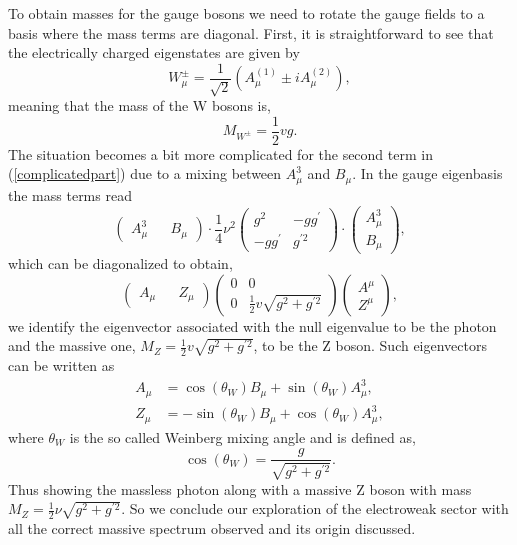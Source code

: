 %
To obtain masses for the gauge bosons we need to rotate the gauge fields to a basis where the mass terms are diagonal. First, it is straightforward to see that the electrically charged eigenstates are given by %
\begin{equation}
W^\pm_\mu = \frac{1}{\sqrt{2}} (A^{(1)}_\mu \pm i A^{(2)}_\mu) , 
\label{gagestate}
\end{equation}
meaning that the mass of the W bosons is, 
\begin{equation}
M_{W^\pm}= \frac{1}{2} v g .
\end{equation}
%
The situation becomes a bit more complicated for the second term in (\ref{complicatedpart}) due to a mixing between $A_\mu^3$ and $B_\mu$. In the gauge eigenbasis the mass terms read
%
\begin{equation}
\begin{pmatrix}
A_\mu^3 && B_\mu
\end{pmatrix} \cdot  \frac{1}{4} \nu ^2 \begin{pmatrix}
g^2  & -g g^\prime \\
-g g^\prime & g^{\prime 2} 
\end{pmatrix} \cdot \begin{pmatrix}
A_\mu^3 \\  B_\mu
\end{pmatrix}  , 
\end{equation} 
%
which can be diagonalized to obtain,
%
\begin{equation}
\begin{pmatrix}
A_\mu && Z_\mu 
\end{pmatrix} \begin{pmatrix}
0  & 0 \\
0  & \frac{1}{2} v \sqrt{g^2 + g^{\prime 2}} 
\end{pmatrix}  \begin{pmatrix}
A^\mu \\ Z^\mu
\end{pmatrix} , 
\end{equation}
%
we identify the eigenvector associated with the null eigenvalue to be the photon and the massive one, $ M_Z =  \frac{1}{2} v \sqrt{g^2 + g^{\prime 2}} $, to be the Z boson. Such eigenvectors can be written as
%
\begin{align}
A_\mu &=\cos(\theta_W) B_\mu + \sin(\theta_W) A_\mu^3 ,  \\  
Z_\mu & =- \sin(\theta_W) B_\mu + \cos(\theta_W) A_\mu^3 , 
\end{align}
%
where $\theta_W$ is the so called Weinberg mixing angle and is defined as, 
%
\begin{equation}
\cos(\theta_W)=\frac{g}{ \sqrt{g^2 + g^{\prime 2}}} . 
\end{equation}
%
Thus showing the massless photon along with a massive Z boson with mass $M_Z= \frac{1}{2} \nu \sqrt{g^2 + g^{\prime 2}} $. 
%
So we conclude our exploration of the electroweak sector with all the correct massive spectrum observed and its origin discussed.


